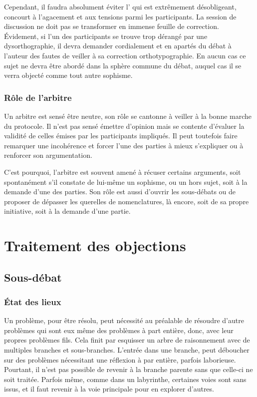 Cependant, il faudra absolument éviter l’ qui est extrêmement désobligeant, concourt à l’agacement et aux tensions parmi les participants. La session de discussion ne doit pas se transformer en immense feuille de correction. Évidement, si l’un des participants se trouve trop dérangé par une dysorthographie, il devra demander cordialement et en apartés du débat à l’auteur des fautes de veiller à sa correction orthotypographie. En aucun cas ce sujet ne devra être abordé dans la sphère commune du débat, auquel cas il se verra objecté comme tout autre sophisme.

\subsubsection{Rôle de l’arbitre}
Un arbitre est sensé être neutre, son rôle se cantonne à veiller à la bonne marche du protocole. Il n’est pas sensé émettre d’opinion mais se contente d’évaluer la validité de celles émises par les participants impliqués. Il peut toutefois faire remarquer une incohérence et forcer l’une des parties à mieux s’expliquer ou à renforcer son argumentation.

C’est pourquoi, l’arbitre est souvent amené à récuser certains arguments, soit spontanément s’il constate de lui-même un sophisme, ou un hors sujet, soit à la demande d’une des parties.
 Son rôle est aussi d’ouvrir les sous-débats ou de proposer de dépasser les querelles de nomenclatures, là encore, soit de sa propre initiative, soit à la demande d’une partie.


\section{Traitement des objections}
\subsection{Sous-débat}
\subsubsection{État des lieux}
Un problème, pour être résolu, peut nécessité au préalable de résoudre d’autre problèmes qui sont eux même des problèmes à part entière, donc, avec leur propres problèmes fils. Cela finit par esquisser un arbre de raisonnement avec de multiples branches et sous-branches. L’entrée dans une branche, peut déboucher sur des problèmes nécessitant une réflexion à par entière, parfois laborieuse. Pourtant, il n’est pas possible de revenir à la branche parente sans que celle-ci ne soit traitée. Parfois même, comme dans un labyrinthe, certaines voies sont sans issus, et il faut revenir à la voie principale pour en explorer d’autres.

